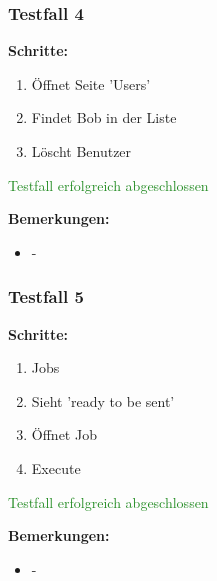 \subsubsection*{Testfall 4}

\textbf{Schritte:}

\begin{enumerate}
    \item Öffnet Seite 'Users'
    \item Findet Bob in der Liste
    \item Löscht Benutzer
\end{enumerate}

\textcolor{ForestGreen}{Testfall erfolgreich abgeschlossen}

\bigskip
\textbf{Bemerkungen:}

\begin{itemize}[noitemsep,nolistsep]
    \item -
\end{itemize}

\subsubsection*{Testfall 5}

\textbf{Schritte:}

\begin{enumerate}
    \item Jobs
    \item Sieht 'ready to be sent'
    \item Öffnet Job
    \item Execute
\end{enumerate}

\textcolor{ForestGreen}{Testfall erfolgreich abgeschlossen}

\bigskip
\textbf{Bemerkungen:}

\begin{itemize}[noitemsep,nolistsep]
    \item -
\end{itemize}